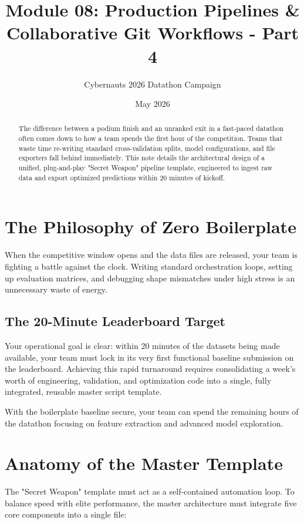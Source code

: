 \documentclass{article}
\title{Module 08: Production Pipelines \& Collaborative Git Workflows - Part 4}
\author{Cybernauts 2026 Datathon Campaign}
\date{May 2026}
\begin{document}
\maketitle

\begin{abstract}
The difference between a podium finish and an unranked exit in a fast-paced datathon often comes down to how a team spends the first hour of the competition. Teams that waste time re-writing standard cross-validation splits, model configurations, and file exporters fall behind immediately. This note details the architectural design of a unified, plug-and-play "Secret Weapon" pipeline template, engineered to ingest raw data and export optimized predictions within 20 minutes of kickoff.
\end{abstract}

\tableofcontents
\newpage

\section{The Philosophy of Zero Boilerplate}
When the competitive window opens and the data files are released, your team is fighting a battle against the clock. Writing standard orchestration loops, setting up evaluation matrices, and debugging shape mismatches under high stress is an unnecessary waste of energy.

\subsection{The 20-Minute Leaderboard Target}
Your operational goal is clear: within 20 minutes of the datasets being made available, your team must lock in its very first functional baseline submission on the leaderboard. Achieving this rapid turnaround requires consolidating a week's worth of engineering, validation, and optimization code into a single, fully integrated, reusable master script template.

With the boilerplate baseline secure, your team can spend the remaining hours of the datathon focusing on feature extraction and advanced model exploration.

\section{Anatomy of the Master Template}
The "Secret Weapon" template must act as a self-contained automation loop. To balance speed with elite performance, the master architecture must integrate five core components into a single file:
\end{document}
